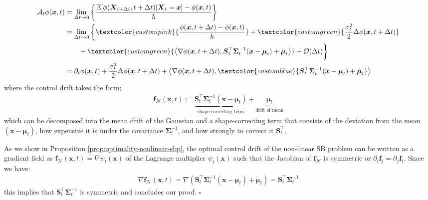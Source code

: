 \documentclass{article}
\newcommand{\bluetext}[1]{\textcolor{customblue}{#1}}
\newcommand{\greentext}[1]{\textcolor{customgreen}{#1}}
\newcommand{\pinktext}[1]{\textcolor{custompink}{#1}}
\begin{document}
\begin{align}
    \mathcal{A}_t\phi(\boldsymbol{x},t)&=\lim_{\Delta t\to 0}\left\{\frac{\mathbb{E}[\phi(\boldsymbol{X}_{t+\Delta t}, t+\Delta t)|\boldsymbol{X}_t=\boldsymbol{x}]-\phi(\boldsymbol{x},t)}{h}\right\}\nonumber\\
    &=\lim_{\Delta t\to 0}\bigg\{\pinktext{\frac{\phi(\boldsymbol{x},t+\Delta t)-\phi(\boldsymbol{x},t)}{h}}+\greentext{\frac{\sigma^2_t}{2}\Delta\phi(\boldsymbol{x},t+\Delta t)}\nonumber\\
    &\quad \quad+\greentext{\big\langle \nabla\phi(\boldsymbol{x},t+\Delta t),  \boldsymbol{S}_t^{\top}\boldsymbol{\Sigma}_t^{-1}(\boldsymbol{x}-\boldsymbol{\mu}_t)+ \dot{\boldsymbol{\mu}}_t\big\rangle}+\mathcal{O}(\Delta t)\bigg\}\nonumber\\
    &=\partial_t\phi(\boldsymbol{x},t)+\frac{\sigma^2_t}{2}\Delta\phi(\boldsymbol{x},t+\Delta t)+\big\langle \nabla\phi(\boldsymbol{x},t+\Delta t),  \bluetext{\boldsymbol{S}_t^{\top}\boldsymbol{\Sigma}_t^{-1}(\boldsymbol{x}-\boldsymbol{\mu}_t)+ \dot{\boldsymbol{\mu}}_t}\big\rangle
\end{align}
where the control drift takes the form:
\begin{align}
    \boxed{\boldsymbol{f}_{\mathcal{N}}(\boldsymbol{x},t):=\underbrace{\boldsymbol{S}_t^{\top}\boldsymbol{\Sigma}_t^{-1}(\boldsymbol{x}-\boldsymbol{\mu}_t)}_{\text{shape-correcting term}}+ \underbrace{\dot{\boldsymbol{\mu}}_t}_{\text{drift of mean}}}\tag{Gaussian SB Drift}
\end{align}
which can be decomposed into the mean drift of the Gaussian and a shape-correcting term that consists of the deviation from the mean $(\boldsymbol{x}-\boldsymbol{\mu}_t)$, how expensive it is under the covariance $\boldsymbol{\Sigma}_t^{-1}$, and how strongly to correct it $\boldsymbol{S}_t^\top$. 

As we show in Proposition \ref{prop:optimality-nonlinear-sbp}, the optimal control drift of the non-linear SB problem can be written as a gradient field as $\boldsymbol{f}_{\mathcal{N}}(\boldsymbol{x},t)=\nabla \psi_t(\boldsymbol{x})$ of the Lagrange multiplier $\psi_t(\boldsymbol{x})$ such that the Jacobian of $\boldsymbol{f}_{\mathcal{N}}$ is symmetric or $\partial_i\boldsymbol{f}_j=\partial_j\boldsymbol{f}_i$. Since we have:
\begin{align}
    \nabla \boldsymbol{f}_{\mathcal{N}}(\boldsymbol{x},t)=\nabla (\boldsymbol{S}_t^{\top}\boldsymbol{\Sigma}_t^{-1}(\boldsymbol{x}-\boldsymbol{\mu}_t)+ \dot{\boldsymbol{\mu}}_t)=\boldsymbol{S}_t^{\top}\boldsymbol{\Sigma}_t^{-1}
\end{align}
this implies that $\boldsymbol{S}_t^{\top}\boldsymbol{\Sigma}_t^{-1}$ is symmetric and concludes our proof. \hfill $\square$
\end{document}

